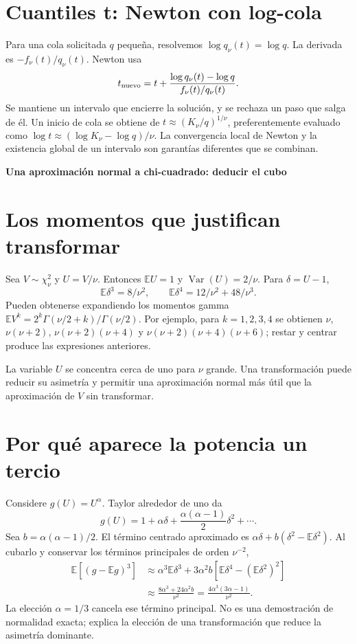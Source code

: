 \documentclass[11pt,a4paper]{article}
\newcommand{\E}{\mathbb E}
\DeclareMathOperator{\Var}{Var}
\theoremstyle{definition}
\newcommand{\parte}[1]{\par\bigskip\Needspace{8\baselineskip}\begin{center}{\Large\bfseries\color{azul}#1}\end{center}}
\begin{document}
\section{Cuantiles t: Newton con log-cola}
Para una cola solicitada $q$ pequeña, resolvemos
$\log q_\nu(t)=\log q$.
La derivada es
$-\!f_\nu(t)/q_\nu(t)$.
Newton usa
\[
t_{\rm nuevo}
=t+\frac{\log q_\nu(t)-\log q}{f_\nu(t)/q_\nu(t)}.
\]
Se mantiene un intervalo que encierre la solución, y se rechaza un paso que salga de él.
Un inicio de cola se obtiene de
$t\approx(K_\nu/q)^{1/\nu}$, preferentemente evaluado como
$\log t\approx(\log K_\nu-\log q)/\nu$.
La convergencia local de Newton y la existencia global de un intervalo son garantías diferentes que se combinan.



\parte{Una aproximación normal a chi-cuadrado: deducir el cubo}
\section{Los momentos que justifican transformar}
Sea $V\sim\chi_\nu^2$ y $U=V/\nu$.
Entonces $\E U=1$ y $\Var(U)=2/\nu$.
Para $\delta=U-1$,
\[
\E\delta^3=8/\nu^2,\qquad
\E\delta^4=12/\nu^2+48/\nu^3.
\]
Pueden obtenerse expandiendo los momentos gamma
$\E V^k=2^k\Gamma(\nu/2+k)/\Gamma(\nu/2)$.
Por ejemplo, para $k=1,2,3,4$ se obtienen
$\nu$, $\nu(\nu+2)$, $\nu(\nu+2)(\nu+4)$ y
$\nu(\nu+2)(\nu+4)(\nu+6)$; restar y centrar produce las expresiones anteriores.

La variable $U$ se concentra cerca de uno para $\nu$ grande.
Una transformación puede reducir su asimetría y permitir una aproximación normal más útil que la aproximación de $V$ sin transformar.

\section{Por qué aparece la potencia un tercio}
Considere $g(U)=U^\alpha$.
Taylor alrededor de uno da
\[
g(U)=1+\alpha\delta+\frac{\alpha(\alpha-1)}2\delta^2+\cdots.
\]
Sea $b=\alpha(\alpha-1)/2$.
El término centrado aproximado es
$\alpha\delta+b(\delta^2-\E\delta^2)$.
Al cubarlo y conservar los términos principales de orden $\nu^{-2}$,
\[
\begin{aligned}
\E[(g-\E g)^3]
&\approx\alpha^3\E\delta^3+
3\alpha^2b[\E\delta^4-(\E\delta^2)^2]\\
&\approx\frac{8\alpha^3+24\alpha^2b}{\nu^2}
=\frac{4\alpha^3(3\alpha-1)}{\nu^2}.
\end{aligned}
\]
La elección $\alpha=1/3$ cancela ese término principal.
No es una demostración de normalidad exacta; explica la elección de una transformación que reduce la asimetría dominante.
\end{document}
